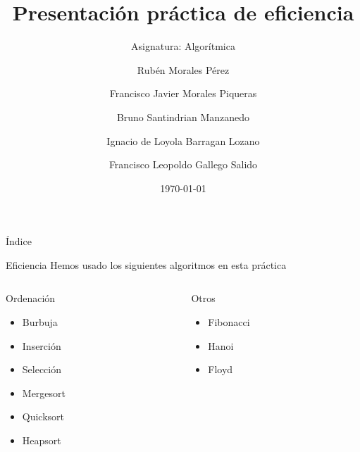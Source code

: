 \documentclass[compress]{beamer}
\title{Presentación práctica de eficiencia}                                               %
\subtitle{Asignatura: Algorítmica}                                  %
\author{Rubén Morales Pérez
		\and Francisco Javier Morales Piqueras
		\and Bruno Santindrian Manzanedo
		\and Ignacio de Loyola Barragan Lozano
		\and Francisco Leopoldo Gallego Salido}
\date{\today}                                                            %
\begin{document}
\begin{frame}
\titlepage
\end{frame}
\begin{frame}{Índice}
  \hypertarget{index}{}
  \tableofcontents
\end{frame}



\begin{frame}
	\begin{block}{Eficiencia}
	Hemos usado los siguientes algoritmos en esta práctica
	\end{block}
	
\begin{columns}  
\begin{column}{5cm}   
	\vspace*{1cm}
	\begin{block}{Ordenaci\'on} 
	\begin{itemize}
		\item Burbuja
		\item Inserción
		\item Selección
		\item Mergesort
		\item Quicksort
		\item Heapsort
	\end{itemize}      
	\end{block}            
\end{column}	

\begin{column}{5cm} 
	\begin{block}{Otros}
	\begin{itemize}
		\item Fibonacci
		\item Hanoi
		\item Floyd
	\end{itemize}    
	\end{block}	                 
\end{column}  
\end{columns}	
\end{frame}
\end{document}
